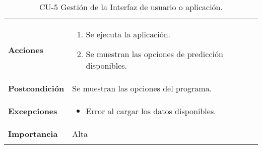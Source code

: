 \begin{longtable}[h!]{@{}ll@{}}
\begin{minipage}[t]{0.23\columnwidth}
\textbf{Acciones}\strut
\end{minipage} & \begin{minipage}[t]{0.71\columnwidth}\raggedright\strut
\begin{enumerate}
\def\labelenumi{\arabic{enumi}.}
\tightlist
\item
  Se ejecuta la aplicación.
\item
  Se muestran las opciones de predicción disponibles.
\end{enumerate}\strut
\end{minipage}\tabularnewline
\begin{minipage}[t]{0.23\columnwidth}\raggedright\strut
\textbf{Postcondición}\strut
\end{minipage} & \begin{minipage}[t]{0.71\columnwidth}\raggedright\strut
Se muestran las opciones del programa.\strut
\end{minipage}\tabularnewline
\begin{minipage}[t]{0.23\columnwidth}\raggedright\strut
\textbf{Excepciones}\strut
\end{minipage} & \begin{minipage}[t]{0.71\columnwidth}\raggedright\strut
\begin{itemize}
\tightlist
\item
  Error al cargar los datos disponibles.
\end{itemize}\strut
\end{minipage}\tabularnewline
\begin{minipage}[t]{0.23\columnwidth}\raggedright\strut
\textbf{Importancia}\strut
\end{minipage} & \begin{minipage}[t]{0.71\columnwidth}\raggedright\strut
Alta\strut
\end{minipage}\tabularnewline
\bottomrule
\caption{CU-5 Gestión de la Interfaz de usuario o aplicación.}
\end{longtable}


